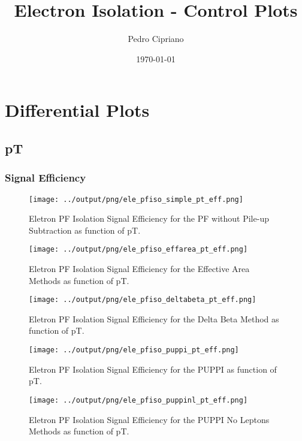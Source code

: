 \documentclass[11pt]{book}
\begin{document}
         
 
 \author{Pedro Cipriano}
 \date{\today}
 \title{Electron Isolation - Control Plots}

\maketitle

\tableofcontents

\chapter{Differential Plots}
\section{pT}

\subsection{Signal Efficiency}
\begin{figure}[htb]
\centering
\texttt{[image: ../output/png/ele\_pfiso\_simple\_pt\_eff.png]}
\caption{Eletron PF Isolation Signal Efficiency for the PF without Pile-up Subtraction as function of pT.}
\label{fig:ele_pfiso_pt_eff_simple}
\end{figure}

\begin{figure}[htb]
\centering
\texttt{[image: ../output/png/ele\_pfiso\_effarea\_pt\_eff.png]}
\caption{Eletron PF Isolation Signal Efficiency for the Effective Area Methods as function of pT.}
\label{fig:ele_pfiso_pt_eff_effarea}
\end{figure}


\begin{figure}[htb]
\centering
\texttt{[image: ../output/png/ele\_pfiso\_deltabeta\_pt\_eff.png]}
\caption{Eletron PF Isolation Signal Efficiency for the Delta Beta Method as function of pT.}
\label{fig:ele_pfiso_pt_eff_deltabeta}
\end{figure}

\begin{figure}[htb]
\centering
\texttt{[image: ../output/png/ele\_pfiso\_puppi\_pt\_eff.png]}
\caption{Eletron PF Isolation Signal Efficiency for the PUPPI as function of pT.}
\label{fig:ele_pfiso_pt_eff_puppi}
\end{figure}

\begin{figure}[htb]
\centering
\texttt{[image: ../output/png/ele\_pfiso\_puppinl\_pt\_eff.png]}
\caption{Eletron PF Isolation Signal Efficiency for the PUPPI No Leptons Methods as function of pT.}
\label{fig:ele_pfiso_pt_eff_puppinl}
\end{figure}
\end{document}
